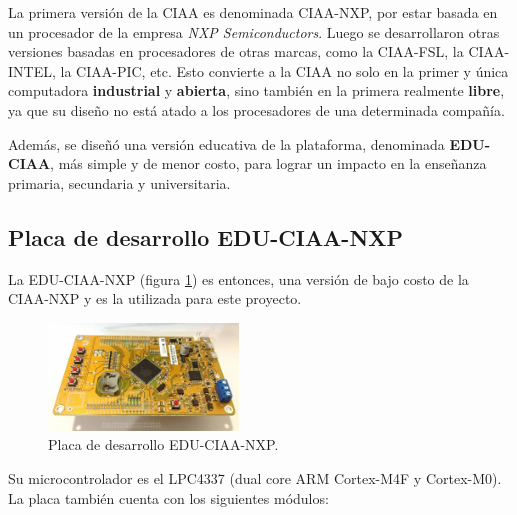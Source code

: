 \documentclass{IEEEtran}
\begin{document}
La primera versión de la CIAA es denominada CIAA-NXP, por estar basada en un procesador de la empresa \textit{NXP Semiconductors}. Luego se desarrollaron otras versiones basadas en procesadores de otras marcas, como la CIAA-FSL, la CIAA-INTEL, la CIAA-PIC, etc. Esto convierte a la CIAA no solo en la primer y única computadora \textbf{industrial} y \textbf{abierta}, sino también en la primera realmente \textbf{libre}, ya que su diseño no está atado a los procesadores de una determinada compañía.

Además, se diseñó una versión educativa de la plataforma, denominada \textbf{EDU-CIAA}, más simple y de menor costo, para lograr un impacto en la enseñanza primaria, secundaria y universitaria.

\subsection{Placa de desarrollo EDU-CIAA-NXP}
La EDU-CIAA-NXP (figura \ref{fig:edu-ciaa}) es entonces, una versión de bajo costo de la CIAA-NXP y es la utilizada para este proyecto.

\begin{figure}[ht]
    \centering
    \includegraphics[width=0.45\textwidth]{../edu_ciaa.jpg}
    \caption{Placa de desarrollo EDU-CIAA-NXP.}
    \label{fig:edu-ciaa}
\end{figure}

Su microcontrolador es el LPC4337 (dual core ARM Cortex-M4F y Cortex-M0). La placa también cuenta con los siguientes módulos:
\end{document}
